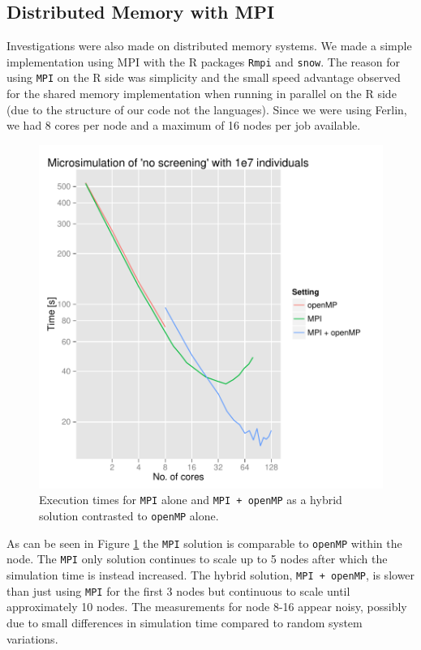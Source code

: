 \subsection{Distributed Memory with MPI}

Investigations were also made on distributed memory
systems. We made a simple implementation using MPI with the R packages \texttt{Rmpi} and
\texttt{snow}. The reason for using \texttt{MPI} on the R side was
simplicity and the small speed advantage observed for the shared memory
implementation when running in parallel on the R side (due to the structure of our
code not the languages). Since we were using Ferlin, we had 8 cores per node
and a maximum of 16 nodes per job available.

\begin{figure}[!htbp] \centering
  \includegraphics[height=0.5\textheight]{images/multiNodeProfiling.pdf}
  \caption{Execution times for \texttt{MPI} alone and \texttt{MPI + openMP} as a hybrid
    solution contrasted to \texttt{openMP} alone.}
  \label{fig:multiNode}
\end{figure} 

As can be seen in Figure \ref{fig:multiNode} the \texttt{MPI} solution
is comparable to \texttt{openMP} within the node. The \texttt{MPI}
only solution continues to scale up to 5 nodes after which the
simulation time is instead increased. The hybrid solution, \texttt{MPI
+ openMP}, is slower than just using \texttt{MPI} for the first 3
nodes but continuous to scale until approximately 10 nodes. The
measurements for node 8-16 appear noisy, possibly due to small
differences in simulation time compared to random system
variations.

